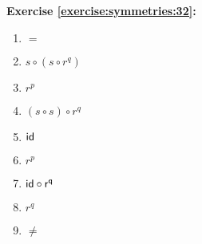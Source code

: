\noindent\textbf{Exercise \ref{exercise:symmetries:32}:}
%
%
\begin{multicols}{3}
\begin{enumerate}
\item
$=$

\item
$s \circ (s \circ r^q)$

\item
$r^p$

\item
$(s \circ s) \circ r^q$

\item
$\sf{id}$

\item
$r^p$

\item
$\sf{id} \circ r^q$

\item
$r^q$


\item
$\neq$
\end{enumerate}
\end{multicols}

